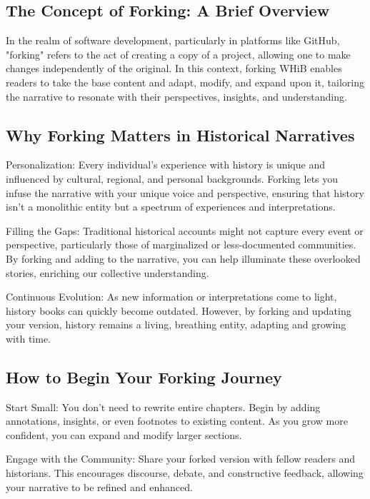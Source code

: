 \documentclass[a4paper,12pt]{book}
\begin{document}
\subsection*{The Concept of Forking: A Brief Overview}

In the realm of software development, particularly in platforms like GitHub, "forking" refers to the act of creating a copy of a project, allowing one to make changes independently of the original. In this context, forking WHiB enables readers to take the base content and adapt, modify, and expand upon it, tailoring the narrative to resonate with their perspectives, insights, and understanding.

\subsection*{Why Forking Matters in Historical Narratives}

Personalization: Every individual's experience with history is unique and influenced by cultural, regional, and personal backgrounds. Forking lets you infuse the narrative with your unique voice and perspective, ensuring that history isn't a monolithic entity but a spectrum of experiences and interpretations.

Filling the Gaps: Traditional historical accounts might not capture every event or perspective, particularly those of marginalized or less-documented communities. By forking and adding to the narrative, you can help illuminate these overlooked stories, enriching our collective understanding.

Continuous Evolution: As new information or interpretations come to light, history books can quickly become outdated. However, by forking and updating your version, history remains a living, breathing entity, adapting and growing with time.

\subsection*{How to Begin Your Forking Journey}

Start Small: You don't need to rewrite entire chapters. Begin by adding annotations, insights, or even footnotes to existing content. As you grow more confident, you can expand and modify larger sections.

Engage with the Community: Share your forked version with fellow readers and historians. This encourages discourse, debate, and constructive feedback, allowing your narrative to be refined and enhanced.
\end{document}
